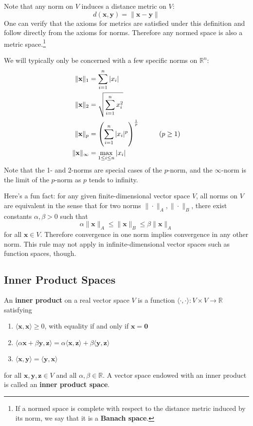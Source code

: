 \documentclass{article}
\newcommand{\R}{\mathbb{R}}
\renewcommand{\vec}[1]{\mathbf{#1}}
\newcommand{\inner}[2]{\langle #1, #2 \rangle}
\newcommand{\term}[1]{\textbf{#1}}
\newcommand{\tab}{\hspace{0.5cm}}
\begin{document}
Note that any norm on $V$ induces a distance metric on $V$:
\[d(\vec{x}, \vec{y}) = \|\vec{x}-\vec{y}\|\]
One can verify that the axioms for metrics are satisfied under this definition and follow directly from the axioms for norms. Therefore any normed space is also a metric space.\footnote{If a normed space is complete with respect to the distance metric induced by its norm, we say that it is a \term{Banach space}.}

We will typically only be concerned with a few specific norms on $\R^n$:
\begin{align*}
\|\vec{x}\|_1 &= \sum_{i=1}^n |x_i| \\
\|\vec{x}\|_2 &= \sqrt{\sum_{i=1}^n x_i^2} \\
\|\vec{x}\|_p &= \left(\sum_{i=1}^n |x_i|^p\right)^\frac{1}{p} \tab\tab (p \geq 1) \\
\|\vec{x}\|_\infty &= \max_{1 \leq i \leq n} |x_i|
\end{align*}
Note that the 1- and 2-norms are special cases of the $p$-norm, and the $\infty$-norm is the limit of the $p$-norm as $p$ tends to infinity.

Here's a fun fact: for any given finite-dimensional vector space $V$, all norms on $V$ are equivalent in the sense that for two norms $\|\cdot\|_A, \|\cdot\|_B$, there exist constants $\alpha, \beta > 0$ such that
\[\alpha\|\vec{x}\|_A \leq \|\vec{x}\|_B \leq \beta\|\vec{x}\|_A\]
for all $\vec{x} \in V$. Therefore convergence in one norm implies convergence in any other norm. This rule may not apply in infinite-dimensional vector spaces such as function spaces, though.

\subsection{Inner Product Spaces}
An \term{inner product} on a real vector space $V$ is a function $\inner{\cdot}{\cdot} : V \times V \to \R$ satisfying
\begin{enumerate}
\item $\inner{\vec{x}}{\vec{x}} \geq 0$, with equality if and only if $\vec{x} = \vec{0}$
\item $\inner{\alpha\vec{x} + \beta\vec{y}}{\vec{z}} = \alpha\inner{\vec{x}}{\vec{z}} + \beta\inner{\vec{y}}{\vec{z}}$
\item $\inner{\vec{x}}{\vec{y}} = \inner{\vec{y}}{\vec{x}}$
\end{enumerate}
for all $\vec{x}, \vec{y}, \vec{z} \in V$ and all $\alpha,\beta \in \R$. A vector space endowed with an inner product is called an \term{inner product space}.
\end{document}
